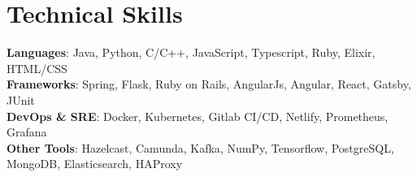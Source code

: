 \documentclass[letterpaper,11pt]{article}
\begin{document}
%
\section{Technical Skills}
 \begin{itemize}[leftmargin=0.15in, label={}]
    \small{\item{
     \textbf{Languages}{: Java, Python, C/C++, JavaScript, Typescript, Ruby, Elixir, HTML/CSS} \\
     \textbf{Frameworks}{: Spring, Flask, Ruby on Rails, AngularJs, Angular, React, Gatsby, JUnit} \\
     \textbf{DevOps \& SRE}{: Docker, Kubernetes, Gitlab CI/CD, Netlify, Prometheus, Grafana} \\
     \textbf{Other Tools}{: Hazelcast, Camunda, Kafka, NumPy, Tensorflow, PostgreSQL, MongoDB, Elasticsearch, HAProxy}
    }}
 \end{itemize}


\end{document}
